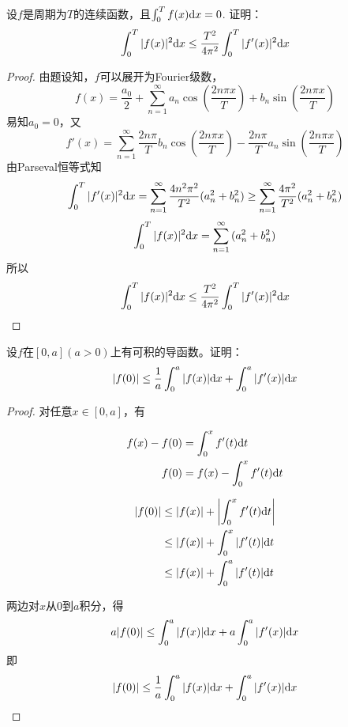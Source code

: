 \begin{proposition}

    设$f$是周期为$T$的连续函数，且$\int_{0}^{T}{f(x)}\mathrm{d} x = 0$. 证明：
    \[\int_{0}^{T}{|f(x)|^2}\mathrm{d} x \leq \dfrac{T^2}{4\pi^2}\int_{0}^{T}{|f'(x)|^2}\mathrm{d} x\]

\end{proposition}

\begin{proof}

    由题设知，$f$可以展开为\textup{Fourier}级数，
    \[f(x) = \dfrac{a_0}{2} + \sum\limits_{n = 1}^{\infty}{a_n\cos{\left( \dfrac{2n\pi x}{T} \right)} + b_n\sin{\left( \dfrac{2n\pi x}{T} \right)}}\]
    易知$a_0 = 0$，又
    \[f'(x) = \sum\limits_{n = 1}^{\infty}{\dfrac{2n\pi}{T}b_n\cos{\left( \dfrac{2n\pi x}{T} \right)} - \dfrac{2n\pi}{T}a_n\sin{\left( \dfrac{2n\pi x}{T} \right)}}\]
    由\textup{Parseval}恒等式知
    \[\int_{0}^{T}{|f'(x)|^2}\mathrm{d} x = \sum\limits_{n = 1}^{\infty}{\dfrac{4n^2\pi^2}{T^2}(a_n^2 + b_n^2)} \geq \sum\limits_{n = 1}^{\infty}{\dfrac{4\pi^2}{T^2}(a_n^2 + b_n^2)}\]
    \[\int_{0}^{T}{|f(x)|^2}\mathrm{d} x = \sum\limits_{n = 1}^{\infty}{(a_n^2 + b_n^2)}\]
    所以 
    \[\int_{0}^{T}{|f(x)|^2}\mathrm{d} x \leq \dfrac{T^2}{4\pi^2}\int_{0}^{T}{|f'(x)|^2}\mathrm{d} x\]

\end{proof}

\begin{proposition}

    设$f$在$[0, a](a > 0)$上有可积的导函数。证明：
    \[|f(0)| \leq \dfrac{1}{a}\int_{0}^{a}{|f(x)|}\mathrm{d} x + \int_{0}^{a}{|f'(x)|}\mathrm{d} x\]

\end{proposition}

\begin{proof}

    对任意$x \in [0, a]$，有

    \begin{align*}
        f(x) - f(0) & = \int_{0}^{x}{f'(t)}\mathrm{d} t \\
        f(0) & = f(x) - \int_{0}^{x}{f'(t)}\mathrm{d} t 
    \end{align*}

    \begin{align*}
        |f(0)| & \leq |f(x)| + \left| \int_{0}^{x}{f'(t)}\mathrm{d} t \right| \\
        & \leq |f(x)| + \int_{0}^{x}{|f'(t)|}\mathrm{d} t \\
        & \leq |f(x)| + \int_{0}^{a}{|f'(t)|}\mathrm{d} t 
    \end{align*}

    两边对$x$从$0$到$a$积分，得
    \[a|f(0)| \leq \int_{0}^{a}{|f(x)|}\mathrm{d} x + a\int_{0}^{a}{|f'(x)|}\mathrm{d} x\]
    即
    \[|f(0)| \leq \dfrac{1}{a}\int_{0}^{a}{|f(x)|}\mathrm{d} x + \int_{0}^{a}{|f'(x)|}\mathrm{d} x\]

\end{proof}

